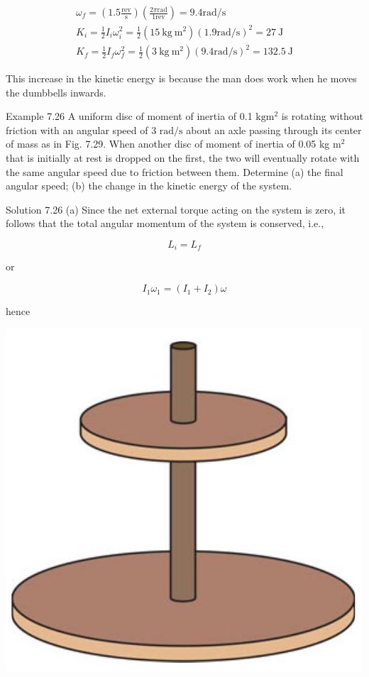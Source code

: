 \documentclass[10pt]{article}
\begin{document}
$$
\begin{gathered}
\omega_{f}=\left(1.5 \frac{\mathrm{rev}}{\mathrm{s}}\right)\left(\frac{2 \pi \mathrm{rad}}{1 \mathrm{rev}}\right)=9.4 \mathrm{rad} / \mathrm{s} \\
K_{i}=\frac{1}{2} I_{i} \omega_{i}^{2}=\frac{1}{2}\left(15 \mathrm{~kg} \mathrm{~m}^{2}\right)(1.9 \mathrm{rad} / \mathrm{s})^{2}=27 \mathrm{~J} \\
K_{f}=\frac{1}{2} I_{f} \omega_{f}^{2}=\frac{1}{2}\left(3 \mathrm{~kg} \mathrm{~m}^{2}\right)(9.4 \mathrm{rad} / \mathrm{s})^{2}=132.5 \mathrm{~J}
\end{gathered}
$$

This increase in the kinetic energy is because the man does work when he moves the dumbbells inwards.

Example 7.26 A uniform disc of moment of inertia of 0.1 $\mathrm{kg} \mathrm{m}^{2}$ is rotating without friction with an angular speed of 3 $\mathrm{rad} / \mathrm{s}$ about an axle passing through its center of mass as in Fig. 7.29. When another disc of moment of inertia of 0.05 kg $\mathrm{m}^{2}$ that is initially at rest is dropped on the first, the two will eventually rotate with the same angular speed due to friction between them. Determine (a) the final angular speed; (b) the change in the kinetic energy of the system.

Solution 7.26 (a) Since the net external torque acting on the system is zero, it follows that the total angular momentum of the system is conserved, i.e.,

$$
L_{i}=L_{f}
$$

or

$$
I_{1} \omega_{1}=\left(I_{1}+I_{2}\right) \omega
$$

hence

\begin{center}
\includegraphics[max width=\textwidth]{2024_09_13_db1f357d2aad0a03eb2eg-128}
\end{center}
\end{document}

